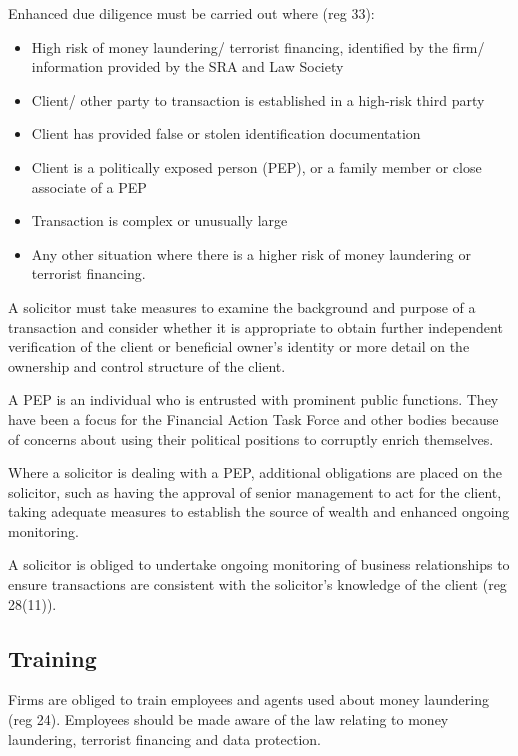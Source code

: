 \documentclass[
]{article}
\providecommand{\tightlist}{%
  \setlength{\itemsep}{0pt}\setlength{\parskip}{0pt}}
\begin{document}
Enhanced due diligence must be carried out where (reg 33):

\begin{itemize}
\tightlist
\item
  High risk of money laundering/ terrorist financing, identified by the
  firm/ information provided by the SRA and Law Society
\item
  Client/ other party to transaction is established in a high-risk third
  party
\item
  Client has provided false or stolen identification documentation
\item
  Client is a politically exposed person (PEP), or a family member or
  close associate of a PEP
\item
  Transaction is complex or unusually large
\item
  Any other situation where there is a higher risk of money laundering
  or terrorist financing.
\end{itemize}

A solicitor must take measures to examine the background and purpose of
a transaction and consider whether it is appropriate to obtain further
independent verification of the client or beneficial owner's identity or
more detail on the ownership and control structure of the client.

A PEP is an individual who is entrusted with prominent public functions.
They have been a focus for the Financial Action Task Force and other
bodies because of concerns about using their political positions to
corruptly enrich themselves.

Where a solicitor is dealing with a PEP, additional obligations are
placed on the solicitor, such as having the approval of senior
management to act for the client, taking adequate measures to establish
the source of wealth and enhanced ongoing monitoring.

A solicitor is obliged to undertake ongoing monitoring of business
relationships to ensure transactions are consistent with the solicitor's
knowledge of the client (reg 28(11)).

\hypertarget{training}{%
\subsection{Training}\label{training}}

Firms are obliged to train employees and agents used about money
laundering (reg 24). Employees should be made aware of the law relating
to money laundering, terrorist financing and data protection.
\end{document}
